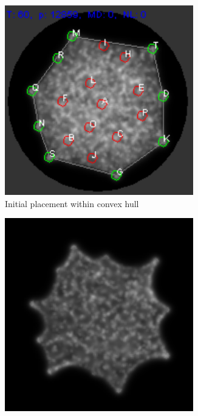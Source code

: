 \documentclass[english,a4paper,twoside]{ppfcmthesis}
\begin{document}
\begin{figure}
  \centering
  \begin{subfigure}{0.3\textwidth}
    \centering
    \includegraphics[width=0.9\textwidth]{background/physarum/tsp_initial.png}
    \caption{Initial placement within convex hull}
    \label{figure:bp_tsp_initial}
  \end{subfigure}
  \begin{subfigure}{0.3\textwidth}
    \centering
    \includegraphics[width=0.9\textwidth]{background/physarum/tsp_intermediate.png}

\end{subfigure}
\end{figure}
\end{document}
